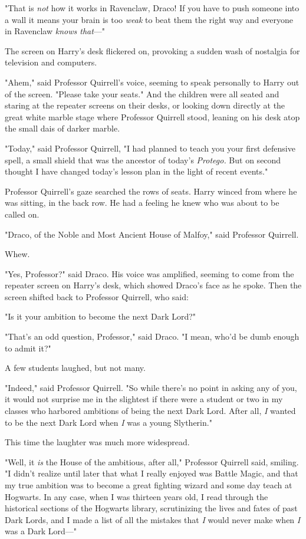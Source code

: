 "That is \emph{not} how it works in Ravenclaw, Draco! If you have to push
someone into a wall it means your brain is too \emph{weak} to beat them the
right way and everyone in Ravenclaw \emph{knows that}---"

The screen on Harry's desk flickered on, provoking a sudden wash of nostalgia
for television and computers.

"Ahem," said Professor Quirrell's voice, seeming to speak personally to Harry
out of the screen. "Please take your seats."
\later
And the children were all seated and staring at the repeater screens on their
desks, or looking down directly at the great white marble stage where Professor
Quirrell stood, leaning on his desk atop the small dais of darker marble.

"Today," said Professor Quirrell, "I had planned to teach you your first
defensive spell, a small shield that was the ancestor of today's
\emph{Protego.} But on second thought I have changed today's lesson plan in the
light of recent events."

Professor Quirrell's gaze searched the rows of seats. Harry winced from where
he was sitting, in the back row. He had a feeling he knew who was about to be
called on.

"Draco, of the Noble and Most Ancient House of Malfoy," said Professor Quirrell.

Whew.

"Yes, Professor?" said Draco. His voice was amplified, seeming to come from the
repeater screen on Harry's desk, which showed Draco's face as he spoke. Then
the screen shifted back to Professor Quirrell, who said:

"Is it your ambition to become the next Dark Lord?"

"That's an odd question, Professor," said Draco. "I mean, who'd be dumb enough
to admit it?"

A few students laughed, but not many.

"Indeed," said Professor Quirrell. "So while there's no point in asking any of
you, it would not surprise me in the slightest if there were a student or two
in my classes who harbored ambitions of being the next Dark Lord. After all,
\emph{I} wanted to be the next Dark Lord when \emph{I} was a young Slytherin."

This time the laughter was much more widespread.

"Well, it \emph{is} the House of the ambitious, after all," Professor Quirrell
said, smiling. "I didn't realize until later that what I really enjoyed was
Battle Magic, and that my true ambition was to become a great fighting wizard
and some day teach at Hogwarts. In any case, when I was thirteen years old, I
read through the historical sections of the Hogwarts library, scrutinizing the
lives and fates of past Dark Lords, and I made a list of all the mistakes that
\emph{I} would never make when \emph{I} was a Dark Lord---"

